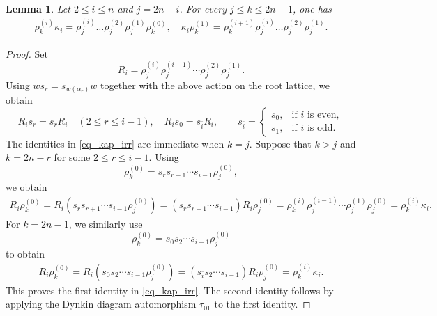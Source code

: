 \documentclass[a4paper]{amsart}
\newtheorem{lem}[thm]{Lemma}
\theoremstyle{remark}
\numberwithin{equation}{section}
\begin{document}
\begin{lem}\label{lem:rectification-B}
Let $2\le i\le n$ and \(j=2n-i\). For every \(j\le k\leq 2n-1\), one has 
\begin{align}\label{eq_kap_irr}
\rho_k^{(i)}\kappa_i=\rho_j^{(i)}\dots\rho_j^{(2)}\rho_j^{(1)}\rho_k^{(0)}, \quad
\kappa_i\rho_k^{(1)}=\rho_k^{(i+1)}\rho_j^{(i)}\dots\rho_j^{(2)}\rho_j^{(1)}.
\end{align}
\end{lem} 

\begin{proof} Set \[ R_i=\rho_j^{(i)}\rho_j^{(i-1)} \cdots\rho_j^{(2)}\rho_j^{(1)}. \] Using $ws_r=s_{w(\alpha_r)}w $ together with the above action on the root lattice, we obtain \[ R_i s_r=s_rR_i \quad (2\leq r\leq i-1) ,\quad R_i s_0=s_{\bar{i}}R_i, \qquad s_{\bar{i}}= \begin{cases} s_0, & \text{if \(i\) is even},\\ s_1, & \text{if \(i\) is odd}. \end{cases} \] The identities in \eqref{eq_kap_irr} are immediate when \(k=j\). Suppose that \(k>j\) and \(k=2n-r\) for some \(2\leq r\leq i-1\). Using \[ \rho_k^{(0)}=s_rs_{r+1}\cdots s_{i-1}\rho_j^{(0)}, \] we obtain 
\begin{align*} R_i\rho_k^{(0)} = R_i(s_rs_{r+1}\cdots s_{i-1}\rho_j^{(0)})= (s_rs_{r+1}\cdots s_{i-1})R_i\rho_j^{(0)}= \rho_k^{(i)} \rho_j^{(i-1)}\cdots\rho_j^{(1)}\rho_j^{(0)}= \rho_k^{(i)}\kappa_i. \end{align*} For \(k=2n-1\), we similarly use \[ \rho_k^{(0)}=s_0s_2\cdots s_{i-1}\rho_j^{(0)} \] to obtain 
\begin{align*} R_i\rho_k^{(0)} = R_i(s_0s_2\cdots s_{i-1}\rho_j^{(0)})= (s_{\bar{i}}s_2\cdots s_{i-1})R_i\rho_j^{(0)}= \rho_k^{(i)}\kappa_i. \end{align*} 
This proves the first identity in \eqref{eq_kap_irr}. The second identity follows by applying the Dynkin diagram automorphism \(\tau_{01}\) to the first identity. 
\end{proof} 
\end{document}
